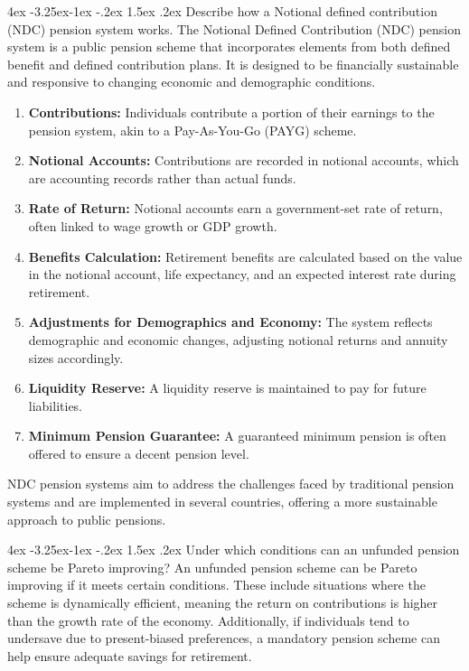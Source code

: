 \documentclass[11pt]{report}
\makeatletter
\renewcommand\subsection{\leftskip 4ex\@startsection{subsection}{2}{\z@}%
	{-3.25ex\@plus -1ex \@minus -.2ex}%
	{1.5ex \@plus .2ex}%
	{\normalfont\large\bfseries}}
\makeatother
\begin{document}
\begin{spacing}{1.5}
	\subsection{Describe how a Notional defined contribution (NDC) pension system works.}
	The Notional Defined Contribution (NDC) pension system is a public pension scheme that incorporates elements from both defined benefit and defined contribution plans. It is designed to be financially sustainable and responsive to changing economic and demographic conditions.
	\begin{enumerate}
		\item \textbf{Contributions:} Individuals contribute a portion of their earnings to the pension system, akin to a Pay-As-You-Go (PAYG) scheme.
		\item \textbf{Notional Accounts:} Contributions are recorded in notional accounts, which are accounting records rather than actual funds.
		\item \textbf{Rate of Return:} Notional accounts earn a government-set rate of return, often linked to wage growth or GDP growth.
		\item \textbf{Benefits Calculation:} Retirement benefits are calculated based on the value in the notional account, life expectancy, and an expected interest rate during retirement.
		\item \textbf{Adjustments for Demographics and Economy:} The system reflects demographic and economic changes, adjusting notional returns and annuity sizes accordingly.
		\item \textbf{Liquidity Reserve:} A liquidity reserve is maintained to pay for future liabilities.
		\item \textbf{Minimum Pension Guarantee:} A guaranteed minimum pension is often offered to ensure a decent pension level.
	\end{enumerate}
	
	NDC pension systems aim to address the challenges faced by traditional pension systems and are implemented in several countries, offering a more sustainable approach to public pensions.


\subsection{Under which conditions can an unfunded pension scheme be Pareto improving?}
An unfunded pension scheme can be Pareto improving if it meets certain conditions. These include situations where the scheme is dynamically efficient, meaning the return on contributions is higher than the growth rate of the economy. Additionally, if individuals tend to undersave due to present-biased preferences, a mandatory pension scheme can help ensure adequate savings for retirement.


\end{spacing}
\end{document}
